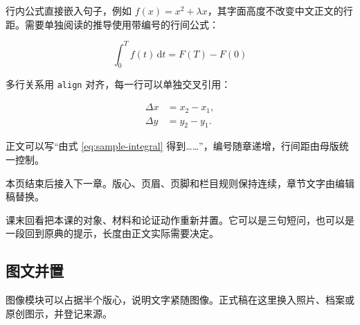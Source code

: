 行内公式直接嵌入句子，例如 $f(x)=x^2+\lambda x$，其字面高度不改变中文正文的行距。需要单独阅读的推导使用带编号的行间公式：

\begin{equation}
  \int_{0}^{T} f(t)\,\mathrm{d}t = F(T)-F(0)
  \label{eq:sample-integral}
\end{equation}

多行关系用 \texttt{align} 对齐，每一行可以单独交叉引用：

\begin{align}
  \Delta x &= x_{2}-x_{1}, \label{eq:sample-dx}\\
  \Delta y &= y_{2}-y_{1}. \label{eq:sample-dy}
\end{align}

正文可以写“由式 \eqref{eq:sample-integral} 得到……”，编号随章递增，行间距由母版统一控制。

本页结束后接入下一章。版心、页眉、页脚和栏目规则保持连续，章节文字由编辑稿替换。

\begin{readingbox}[课末回看]
课末回看把本课的对象、材料和论证动作重新并置。它可以是三句短问，也可以是一段回到原典的提示，长度由正文实际需要决定。
\end{readingbox}

\subsection{图文并置}

图像模块可以占据半个版心，说明文字紧随图像。正式稿在这里换入照片、档案或原创图示，并登记来源。

